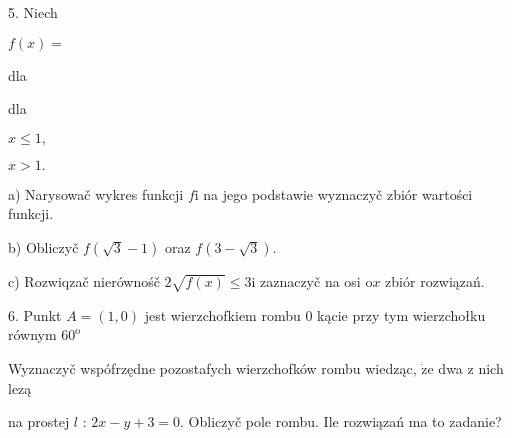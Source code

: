 \documentclass[a4paper,12pt]{article}
\begin{document}
5. Niech

$f(x)=$

dla

dla

$x\leq 1,$

$x>1.$

a) Narysowač wykres funkcji $f\mathrm{i}$ na jego podstawie wyznaczyč zbiór wartości funkcji.

b) Obliczyč $f(\sqrt{3}-1)$ oraz $f(3-\sqrt{3}).$

c) Rozwiqzač nierównośč $2\sqrt{f(x)}\leq 3\mathrm{i}$ zaznaczyč na osi $\mathrm{o}x$ zbiór rozwiązań.

6. Punkt $A=(1,0)$ jest wierzchofkiem rombu $0$ kącie przy tym wierzchołku równym $60^{\mathrm{o}}$

Wyznaczyč wspófrzędne pozostafych wierzchofków rombu wiedząc, $\dot{\mathrm{z}}\mathrm{e}$ dwa $\mathrm{z}$ nich lezą

na prostej $l$ : $2x-y+3=0$. Obliczyč pole rombu. Ile rozwiązań ma to zadanie?
\end{document}
